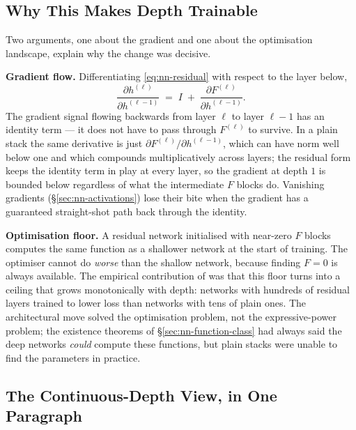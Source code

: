\subsection{Why This Makes Depth Trainable}

Two arguments, one about the gradient and one about the
optimisation landscape, explain why the change was decisive.

\textbf{Gradient flow.} Differentiating \eqref{eq:nn-residual}
with respect to the layer below,
\[
  \frac{\partial h^{(\ell)}}{\partial h^{(\ell-1)}}
  \;=\; I \;+\; \frac{\partial F^{(\ell)}}{\partial h^{(\ell-1)}}.
\]
The gradient signal flowing backwards from layer $\ell$ to layer
$\ell-1$ has an identity term --- it does not have to pass
through $F^{(\ell)}$ to survive. In a plain stack the same
derivative is just $\partial F^{(\ell)} / \partial h^{(\ell-1)}$,
which can have norm well below one and which compounds
multiplicatively across layers; the residual form keeps the
identity term in play at every layer, so the gradient at depth
$1$ is bounded below regardless of what the intermediate $F$
blocks do. Vanishing gradients (\S\ref{sec:nn-activations}) lose
their bite when the gradient has a guaranteed straight-shot path
back through the identity.

\textbf{Optimisation floor.} A residual network initialised with
near-zero $F$ blocks computes the same function as a shallower
network at the start of training. The optimiser cannot do
\emph{worse} than the shallow network, because finding $F = 0$
is always available. The empirical contribution of
\citet{he2016resnet} was that this floor turns into a ceiling
that grows monotonically with depth: networks with hundreds of
residual layers trained to lower loss than networks with tens of
plain ones. The architectural move solved the optimisation
problem, not the expressive-power problem; the existence
theorems of §\ref{sec:nn-function-class} had always said the
deep networks \emph{could} compute these functions, but plain
stacks were unable to find the parameters in practice.

\subsection{The Continuous-Depth View, in One Paragraph}

